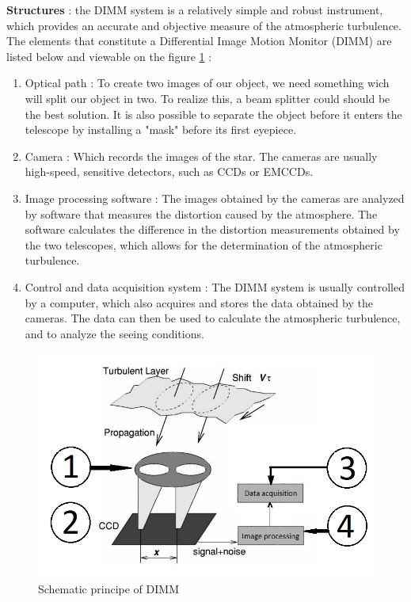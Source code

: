 \bigbreak
\textbf{Structures} : \newline the \Gls{DIMM} system is a relatively simple and robust instrument, which provides an accurate and objective measure of the atmospheric turbulence.
The elements that constitute a Differential Image Motion Monitor (\Gls{DIMM}) are listed below and viewable on the figure
\ref{fig:DIMM_Schematic} :
\begin{enumerate}
    \item Optical path : To create two images of our object, we need something wich will split our object in two. To realize this, a beam splitter could
          should be the best solution. It is also possible to separate the object before it enters the telescope by installing a "mask" before its first
          eyepiece.
    \item Camera : Which records the images of the star. The cameras are usually high-speed, sensitive detectors, such as CCDs or EMCCDs.
    \item Image processing software : The images obtained by the cameras are analyzed by software that measures the distortion caused by the atmosphere.
          The software calculates the difference in the distortion measurements obtained by the two telescopes, which allows for the determination of the
          atmospheric turbulence.
    \item Control and data acquisition system : The \Gls{DIMM} system is usually controlled by a computer, which also acquires and stores the data obtained by
          the cameras. The data can then be used to calculate the atmospheric turbulence, and to analyze the seeing conditions.
\end{enumerate}
\begin{figure}[H]
    \centering
    \includegraphics[scale = 0.8]{assets/figures/Theory/DIMM_Schematic.jpg}
    \caption{Schematic principe of \Gls{DIMM}}
    \label{fig:DIMM_Schematic}
\end{figure}

